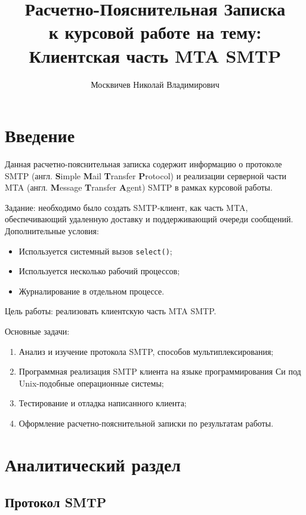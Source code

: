 \documentclass[a4paper,12pt]{report}
\title{Расчетно-Пояснительная Записка \\ 
    \large к курсовой работе на тему: \\ Клиентская часть MTA SMTP}
\author{Москвичев Николай Владимирович}
\begin{document}
\maketitle


\tableofcontents

\clearpage
\chapter*{Введение}

Данная расчетно-пояснительная записка содержит информацию о протоколе SMTP (англ. \textbf{S}imple \textbf{M}ail \textbf{T}ransfer \textbf{P}rotocol) и реализации серверной части MTA (англ. \textbf{M}essage \textbf{T}ransfer \textbf{A}gent) SMTP в рамках курсовой работы.

Задание: необходимо было создать SMTP-клиент, как часть MTA, обеспечивающий удаленную доставку и поддерживающий очереди сообщений. Дополнительные условия:
\begin{itemize}
\item Используется системный вызов \texttt{select()};
\item Используется несколько рабочий процессов;
\item Журналирование в отдельном процессе.
\end{itemize}

Цель работы: реализовать клиентскую часть MTA SMTP.

Основные задачи:
\begin{enumerate}
    \item Анализ и изучение протокола SMTP, способов мультиплексирования;
    \item Программная реализация SMTP клиента на языке программирования Си под Unix-подобные операционные системы;
    \item Тестирование и отладка написанного клиента;
    \item Оформление расчетно-пояснительной записки по результатам работы.
\end{enumerate}


\chapter{Аналитический раздел}


\section{Протокол SMTP}
\end{document}
